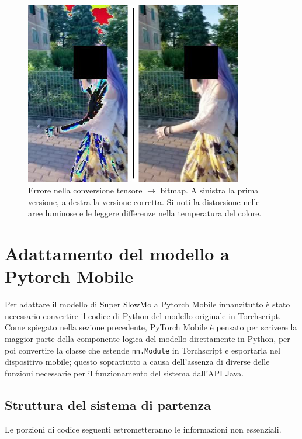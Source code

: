 \begin{figure}[!bh]
    \centering
    \includegraphics[width=0.85\textwidth]{img/conversione_img_errore.jpg}
    \caption{Errore nella conversione tensore $\rightarrow$ bitmap. A sinistra la prima versione, 
    a destra la versione corretta. Si noti la distorsione nelle aree luminose e le leggere
    differenze nella temperatura del colore.}
    \label{fig:img_conversion_error}
\end{figure}


\FloatBarrier

\section{Adattamento del modello a Pytorch Mobile}

Per adattare il modello di Super SlowMo a Pytorch Mobile innanzitutto è 
stato necessario convertire il codice di Python del modello originale in
Torchscript. Come spiegato nella sezione precedente, PyTorch Mobile è pensato
per scrivere la maggior parte della componente logica del modello direttamente in Python, 
per poi convertire la classe che estende \texttt{nn.Module} in Torchscript e esportarla nel
dispositivo mobile; questo soprattutto a causa dell'assenza di diverse delle funzioni necessarie
per il funzionamento del sistema dall'API Java.

\subsection{Struttura del sistema di partenza}

Le porzioni di codice seguenti estrometteranno le informazioni non essenziali.

